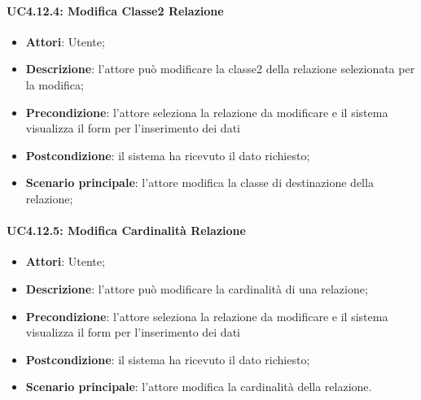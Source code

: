 \paragraph{UC4.12.4: Modifica Classe2 Relazione}
\label{UC4.12.4}
\begin{itemize}
\item \textbf{Attori}: Utente;
\item \textbf{Descrizione}: l'attore può modificare la classe2 della relazione selezionata per la modifica;
\item \textbf{Precondizione}: l'attore seleziona la relazione da modificare e il sistema visualizza il form per l'inserimento dei dati	
\item \textbf{Postcondizione}: il sistema ha ricevuto il dato richiesto;	
\item \textbf{Scenario principale}:
l'attore modifica la classe di destinazione della relazione;	
\end{itemize}

\paragraph{UC4.12.5: Modifica Cardinalità Relazione}
\label{UC4.12.5}
\begin{itemize}
\item \textbf{Attori}: Utente;
\item \textbf{Descrizione}: l'attore può modificare la cardinalità di una relazione;
\item \textbf{Precondizione}: l'attore seleziona la relazione da modificare e il sistema visualizza il form per l'inserimento dei dati	
\item \textbf{Postcondizione}: il sistema ha ricevuto il dato richiesto;	
\item \textbf{Scenario principale}:
l'attore modifica la cardinalità della relazione.
\end{itemize}

